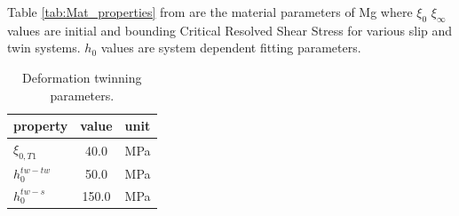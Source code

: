 Table \ref{tab:Mat_properties} from \cite{Tromans2011ELASTICAO} \cite{AGNEW20064841} are the material parameters of Mg where $\xi_0$ $\xi_\infty$ values are initial and bounding Critical Resolved Shear Stress for various slip and twin systems. $h_0$ values are system dependent fitting parameters.


\begin{table}[H]
    \begin{subtable}[h]{0.45\textwidth}
    \centering
    \caption{Deformation twinning parameters.}
    \label{tab:Twin_parameters}
          \begin{tabular}{lS[table-format=4.1]l}
                \hline
                property & {value} & unit \\
                \hline
                 $\xi_{0,T1}$ & 40.0 & MPa \\
                 $h^{tw-tw}_{0}$ & 50.0 & MPa \\
                 $h^{tw-s}_{0}$ & 150.0 & MPa \\
                \hline
          \end{tabular}
    \end{subtable}
    \vspace{-2em}
    

\end{table}

